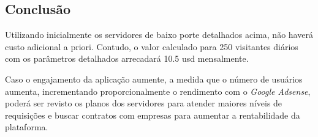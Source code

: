 \subsection{Conclusão}
Utilizando inicialmente os servidores de baixo porte detalhados acima, não haverá custo adicional a priori.
Contudo, o valor calculado para 250 visitantes diários com os parâmetros detalhados arrecadará 10.5 \acs{usd} mensalmente.

Caso o engajamento da aplicação aumente, a medida que o número de usuários aumenta,
incrementando proporcionalmente o rendimento com o \emph{Google Adsense}, poderá ser revisto os planos dos
servidores para atender maiores níveis de requisições e buscar contratos com empresas para aumentar 
a rentabilidade da plataforma.